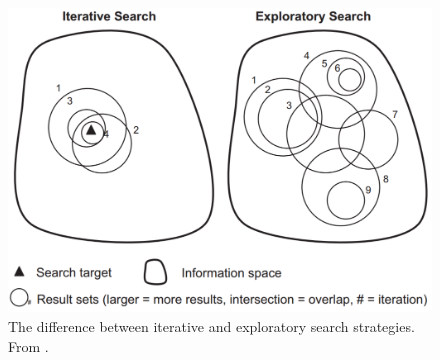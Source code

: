 \begin{figure}[htp] %
\caption{The difference between iterative and exploratory search strategies. From \protect\cite{white09}.}
\label{figure_IterativeVsExploratory}
\centering
\includegraphics[scale=0.25]{figures/IterativeSearch_vs_ExploratorySearch.pdf}
\end{figure}


